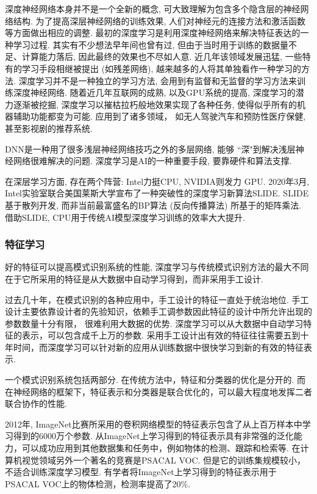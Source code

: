 深度神经网络本身并不是一个全新的概念, 可大致理解为包含多个隐含层的神经网络结构.
为了提高深层神经网络的训练效果, 人们对神经元的连接方法和激活函数等方面做出相应的调整.
最初的深度学习是利用深度神经网络来解决特征表达的一种学习过程.
其实有不少想法早年间也曾有过, 但由于当时用于训练的数据量不足、计算能力落后, 因此最终的效果也不尽如人意.
近几年该领域发展迅猛, 一些特有的学习手段相继被提出 (如残差网络), 越来越多的人将其单独看作一种学习的方法.
深度学习并不是一种独立的学习方法, 会用到有监督和无监督的学习方法来训练深度神经网络.
随着近几年互联网的成熟, 以及GPU系统的提高, 深度学习的潜力逐渐被挖掘, 深度学习以摧枯拉朽般地效果实现了各种任务, 使得似乎所有的机器辅助功能都变为可能.
应用到了诸多领域， 如无人驾驶汽车和预防性医疗保健, 甚至影视剧的推荐系统.

\begin{remark}
    DNN是一种用了很多浅层神经网络技巧之外的多层网络, 能够 ``深"到解决浅层神经网络很难解决的问题.
深度学习是AI的一种重要手段, 要靠硬件和算法支撑.
\end{remark}

在深层学习方面, 存在两个阵营: Intel力挺CPU, NVIDIA则发力 GPU.
2020年3月, Intel实验室联合美国莱斯大学宣布了一种突破性的深度学习新算法SLIDE.
SLIDE基于散列开发, 而非当前最富盛名的BP算法 (反向传播算法) 所基于的矩阵乘法.
借助SLIDE, CPU用于传统AI模型深度学习训练的效率大大提升.
\subsubsection{特征学习}
好的特征可以提高模式识别系统的性能, 深度学习与传统模式识别方法的最大不同在于它所采用的特征是从大数据中自动学习得到，而非采用手工设计.

过去几十年，在模式识别的各种应用中，手工设计的特征一直处于统治地位.
手工设计主要依靠设计者的先验知识，依赖手工调参数因此特征的设计中所允许出现的参数数量十分有限， 很难利用大数据的优势.
深度学习可以从大数据中自动学习特征的表示，可以包含成千上万的参数.
采用手工设计出有效的特征往往需要五到十年时间，而深度学习可以针对新的应用从训练数据中很快学习到新的有效的特征表示.

一个模式识别系统包括两部分. 在传统方法中，特征和分类器的优化是分开的.
而在神经网络的框架下，特征表示和分类器是联合优化的，可以最大程度地发挥二者联合协作的性能.

\begin{example}
2012年, ImageNet比赛所采用的卷积网络模型的特征表示包含了从上百万样本中学习得到的6000万个参数.
从ImageNet上学习得到的特征表示具有非常强的泛化能力，可以成功应用到其他数据集和任务中，例如物体的检测、跟踪和检索等.
在计算机视觉领域另外一个著名的竞赛是PSACAL VOC.
但是它的训练集规模较小，不适合训练深度学习模型. 有学者将ImageNet上学习得到的特征表示用于 PSACAL VOC上的物体检测，检测率提高了20\%.
\end{example}

